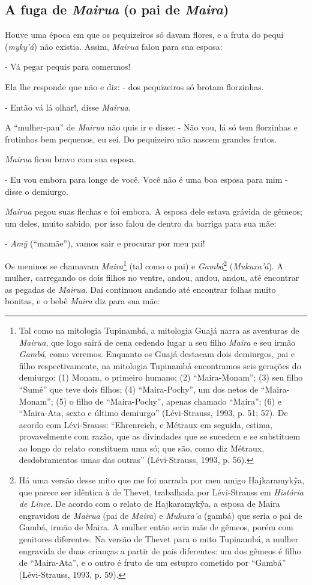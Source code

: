 \subsection{A fuga de \emph{Mairua} (o pai de \emph{Maira})}

Houve uma época em que os pequizeiros só davam flores, e a fruta do
pequi (\emph{myky'á}) não existia. Assim, \emph{Mairua} falou para sua
esposa:

- Vá pegar pequis para comermos!

Ela lhe responde que não e diz: - dos pequizeiros só brotam florzinhas.

- Então vá lá olhar!, disse \emph{Mairua}.

A ``mulher-pau'' de \emph{Mairua} não quis ir e disse: - Não vou, lá só
tem florzinhas e frutinhos bem pequenos, eu sei. Do pequizeiro não
nascem grandes frutos.

\emph{Mairua} ficou bravo com sua esposa.

- Eu vou embora para longe de você. Você não é uma boa esposa para mim -
disse o demiurgo.

\emph{Mairua} pegou suas flechas e foi embora. A esposa dele estava
grávida de gêmeos; um deles, muito sabido, por isso falou de dentro da
barriga para sua mãe:

- \emph{Amỹ} (``mamãe''), vamos sair e procurar por meu pai!

Os meninos se chamavam \emph{Maira}\footnote{Tal como na mitologia
  Tupinambá, a mitologia Guajá narra as aventuras de \emph{Mairua}, que
  logo sairá de cena cedendo lugar a seu filho \emph{Maira} e seu irmão
  \emph{Gambá}, como veremos. Enquanto os Guajá destacam dois demiurgos,
  pai e filho respectivamente, na mitologia Tupinambá encontramos seis
  gerações do demiurgo: (1) Monam, o primeiro humano; (2) ``Maira-Monam'';
  (3) seu filho ``Sumé'' que teve dois filhos; (4) ``Maira-Pochy'', um dos
  netos de ``Maira-Monam''; (5) o filho de ``Maira-Pochy'', apenas chamado
  ``Maira''; (6) e ``Maira-Ata, sexto e último demiurgo'' (Lévi-Strauss,
  1993, p. 51; 57). De acordo com Lévi-Srauss: ``Ehrenreich, e Métraux em
      seguida, estima, provavelmente com razão, que as divindades que se
      sucedem e se substituem ao longo do relato constituem uma só; que são,
      como diz Métraux, desdobramentos umas das outras'' (Lévi-Strauss, 1993,
  p. 56).} (tal como o pai) e \emph{Gambá}\footnote{Há uma versão desse
  mito que me foi narrada por meu amigo Hajkaramykỹa, que parece ser
  idêntica à de Thevet, trabalhada por Lévi-Strauss em \emph{História de
  Lince}. De acordo com o relato de Hajkaramykỹa, a esposa de Maíra
  engravidou de \emph{Mairua} (pai de \emph{Maira}) e \emph{Mukuxa'a}
  (gambá) que seria o pai de Gambá, irmão de Maira. A mulher então seria
  mãe de gêmeos, porém com genitores diferentes. Na versão de Thevet
  para o mito Tupinambá, a mulher engravida de duas crianças a partir de
  pais diferentes: um dos gêmeos é filho de ``Maira-Ata'', e o outro é
  fruto de um estupro cometido por ``Gambá'' (Lévi-Strauss, 1993, p. 59).}
(\emph{Mukuxa'á}). A mulher, carregando os dois filhos no ventre, andou,
andou, andou, até encontrar as pegadas de \emph{Mairua}. Daí continuou
andando até encontrar folhas muito bonitas, e o bebê \emph{Maira} diz
para sua mãe:

